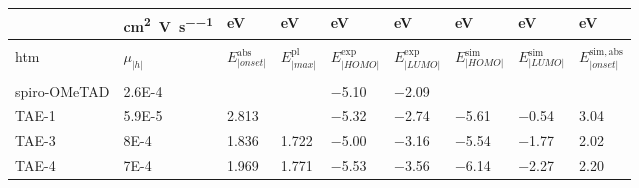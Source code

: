 \begin{table}
\begin{xltabular}[c]{1.05\linewidth}{@{} >{\hsize}Y | >{\hsize}Y >{\hsize}Y >{\hsize}Y >{\hsize}Y >{\hsize}Y >{\hsize}Y >{\hsize}Y Y @{}}
			& \footnotesize\si{\square\cm\per\V\per\s} & \footnotesize\si{\eV} & \footnotesize\si{\eV} & \footnotesize\si{\eV} & \footnotesize\si{\eV} & \footnotesize\si{\eV} & \footnotesize\si{\eV} & \footnotesize\si{\eV} \\[1mm]
			\hline
			\endfirsthead
			\\
			\hline
			\small\gls{htm} & \small$\mu_|h|$ & \small$E^{\mathrm{abs}}_|onset|$ & \small$E^{\mathrm{pl}}_|max|$ & \small$E^{\mathrm{exp}}_|HOMO|$ & \small$E^{\mathrm{exp}}_|LUMO|$ & \small$E^{\mathrm{sim}}_|HOMO|$ & \small$E^{\mathrm{sim}}_|LUMO|$ & \small$E^{\mathrm{sim,abs}}_|onset|$\\
			\hline
			\endhead
			\hline
			\\
			\endfoot
			\hline
			\endlastfoot
			\rule[-1ex]{0pt}{3ex}
			spiro-OMeTAD 		& \num{2.6E-4} 	& 				& 					& \num{-5.10}	& \num{-2.09}	& 				&  				& \\
			TAE-1				& \num{5.9E-5} 	& \num{2.813}	& 					& \num{-5.32}	& \num{-2.74}	& \num{-5.61}	& \num{-0.54}	& \num{3.04} \\
			TAE-3 				& \num{8E-4} 	& \num{1.836}	& \num{1.722}		& \num{-5.00}	& \num{-3.16}	& \num{-5.54}	& \num{-1.77}	& \num{2.02} \\
			TAE-4 				& \num{7E-4} 	& \num{1.969}	& \num{1.771}		& \num{-5.53}	& \num{-3.56}	& \num{-6.14}	& \num{-2.27}	& \num{2.20} \\
		\end{xltabular}
	\end{table}

